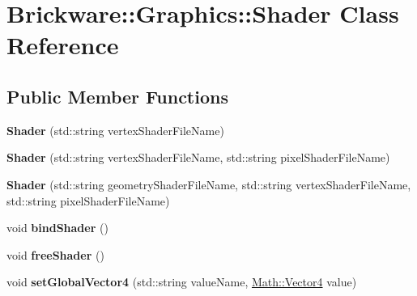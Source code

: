 \hypertarget{classBrickware_1_1Graphics_1_1Shader}{}\section{Brickware\+:\+:Graphics\+:\+:Shader Class Reference}
\label{classBrickware_1_1Graphics_1_1Shader}
\subsection*{Public Member Functions}
\begin{DoxyCompactItemize}
\item 
\hypertarget{classBrickware_1_1Graphics_1_1Shader_ac33e1ee1da681d879e262f2ab94da827}{}{\bfseries Shader} (std\+::string vertex\+Shader\+File\+Name)\label{classBrickware_1_1Graphics_1_1Shader_ac33e1ee1da681d879e262f2ab94da827}

\item 
\hypertarget{classBrickware_1_1Graphics_1_1Shader_acdb393ef94c218a986215e9e1e412455}{}{\bfseries Shader} (std\+::string vertex\+Shader\+File\+Name, std\+::string pixel\+Shader\+File\+Name)\label{classBrickware_1_1Graphics_1_1Shader_acdb393ef94c218a986215e9e1e412455}

\item 
\hypertarget{classBrickware_1_1Graphics_1_1Shader_a1c29b436218ca76507ab4139c1d59760}{}{\bfseries Shader} (std\+::string geometry\+Shader\+File\+Name, std\+::string vertex\+Shader\+File\+Name, std\+::string pixel\+Shader\+File\+Name)\label{classBrickware_1_1Graphics_1_1Shader_a1c29b436218ca76507ab4139c1d59760}

\item 
\hypertarget{classBrickware_1_1Graphics_1_1Shader_a8fcfe0d5899b13e55cec2f138a2fc5db}{}void {\bfseries bind\+Shader} ()\label{classBrickware_1_1Graphics_1_1Shader_a8fcfe0d5899b13e55cec2f138a2fc5db}

\item 
\hypertarget{classBrickware_1_1Graphics_1_1Shader_a8c084ee015200b875d719f5180524f71}{}void {\bfseries free\+Shader} ()\label{classBrickware_1_1Graphics_1_1Shader_a8c084ee015200b875d719f5180524f71}

\item 
\hypertarget{classBrickware_1_1Graphics_1_1Shader_ac218ae064af3db914af5d87b0c215889}{}void {\bfseries set\+Global\+Vector4} (std\+::string value\+Name, \hyperlink{classBrickware_1_1Math_1_1Vector4}{Math\+::\+Vector4} value)\label{classBrickware_1_1Graphics_1_1Shader_ac218ae064af3db914af5d87b0c215889}


\end{DoxyCompactItemize}
